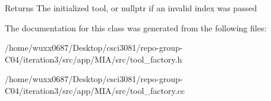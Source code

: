 \begin{DoxyReturn}{Returns}
The initialized tool, or nullptr if an invalid index was passed 
\end{DoxyReturn}


The documentation for this class was generated from the following files\+:\begin{DoxyCompactItemize}
\item 
/home/wuxx0687/\+Desktop/csci3081/repo-\/group-\/\+C04/iteration3/src/app/\+M\+I\+A/src/tool\+\_\+factory.\+h\item 
/home/wuxx0687/\+Desktop/csci3081/repo-\/group-\/\+C04/iteration3/src/app/\+M\+I\+A/src/tool\+\_\+factory.\+cc\end{DoxyCompactItemize}
